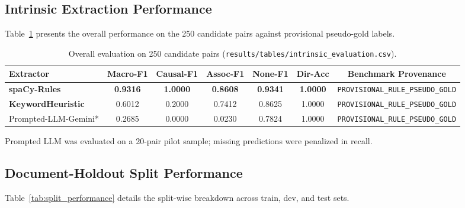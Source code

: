 \documentclass[11pt,a4paper]{article}
\begin{document}
\subsection{Intrinsic Extraction Performance}
Table~\ref{tab:intrinsic_evaluation} presents the overall performance on the 250 candidate pairs against provisional pseudo-gold labels.

\begin{table}[htbp]
\centering
\small
\caption{Overall evaluation on 250 candidate pairs (\texttt{results/tables/intrinsic\_evaluation.csv}).}
\label{tab:intrinsic_evaluation}
\begin{tabularx}{\textwidth}{l ccccc c}
\toprule
\textbf{Extractor} & \textbf{Macro-F1} & \textbf{Causal-F1} & \textbf{Assoc-F1} & \textbf{None-F1} & \textbf{Dir-Acc} & \textbf{Benchmark Provenance} \\
\midrule
\textbf{spaCy-Rules}     & \textbf{0.9316} & \textbf{1.0000} & \textbf{0.8608} & \textbf{0.9341} & \textbf{1.0000} & \texttt{PROVISIONAL\_RULE\_PSEUDO\_GOLD} \\
\textbf{KeywordHeuristic} & 0.6012 & 0.2000 & 0.7412 & 0.8625 & 1.0000 & \texttt{PROVISIONAL\_RULE\_PSEUDO\_GOLD} \\
Prompted-LLM-Gemini*     & 0.2685 & 0.0000 & 0.0230 & 0.7824 & 1.0000 & \texttt{PROVISIONAL\_RULE\_PSEUDO\_GOLD} \\
\bottomrule
\end{tabularx}
\vspace{0.3em}
\raggedright \footnotesize *Prompted LLM was evaluated on a 20-pair pilot sample; missing predictions were penalized in recall.
\end{table}

\subsection{Document-Holdout Split Performance}
Table~\ref{tab:split_performance} details the split-wise breakdown across train, dev, and test sets.
\end{document}
